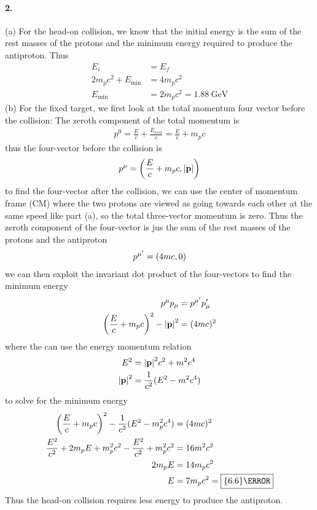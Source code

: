 \documentclass[../main.tex]{subfiles}
\begin{document}
\paragraph{2.} (a) For the head-on collision, we know that the initial energy is the sum of the rest
masses of the protons and the minimum energy required to produce the antiproton. Thus
\begin{align*}
    E_i &= E_f \\
    2m_p c^2 + E_{\text{min}} &= 4m_p c^2 \\
    E_{\text{min}} &= 2m_p c^2 = \boxed{\qty{1.88}{\GeV}}
\end{align*}
(b) For the fixed target, we first look at the total momentum four vector before the collision:
The zeroth component of the total momentum is
\begin{align*}
    p^0 = \frac{E}{c} + \frac{E_{rest}}{c} = \frac{E}{c} + m_p c
\end{align*}
thus the four-vector before the collision is
\begin{align*}
    p^\mu = \qt(\frac{E}{c} + m_p c, \abs{\vb{p}})
\end{align*}
to find the four-vector after the collision, we can use the center of momentum frame (CM) where the
two protons are viewed as going towards each other at the same speed like part (a), so the 
total three-vector momentum is zero. Thus the zeroth component of the four-vector is jus the sum of
the rest masses of the protons and the antiproton
\begin{align*}
    p^{\mu'} = \qt(4mc, 0)
\end{align*}
we can then exploit the invariant dot product of the four-vectors to find the minimum energy
\begin{align*}
    p^\mu p_\mu &= p^{\mu'} p_\mu' \\
    \qt(\frac{E}{c} + m_p c)^2 - \abs{\vb{p}}^2 &= (4mc)^2
\end{align*}
where the can use the energy momentum relation
\begin{align*}
    E^2 &= \abs{\vb{p}}^2 c^2 + m^2 c^4 \\
    \abs{\vb{p}}^2 &= \frac{1}{c^2} (E^2 - m^2 c^4)
\end{align*}
to solve for the minimum energy
\begin{align*}
    \qt(\frac{E}{c} + m_p c)^2 - \frac{1}{c^2} (E^2 - m_p^2 c^4) &= (4mc)^2 \\
    \frac{E^2}{c^2} + 2m_p E + m_p^2 c^2 - \frac{E^2}{c^2} + m_p^2 c^2 &= 16m^2 c^2 \\
    2m_p E &= 14m_p c^2 \\
    E &= 7m_p c^2 = \boxed{\qty{6.6}{\GeV}}
\end{align*}
Thus the head-on collision requires less energy to produce the antiproton.
\end{document}
